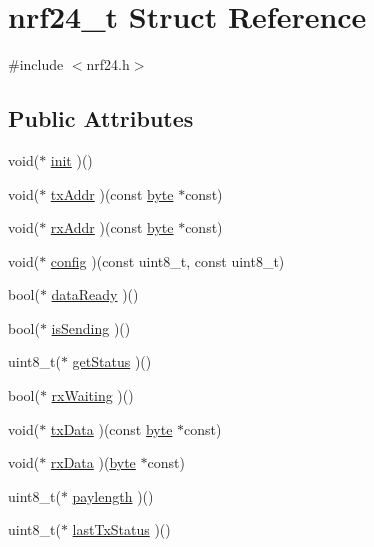 \hypertarget{structnrf24__t}{}\section{nrf24\+\_\+t Struct Reference}
\label{structnrf24__t}


{\ttfamily \#include $<$nrf24.\+h$>$}

\subsection*{Public Attributes}
\begin{DoxyCompactItemize}
\item 
void($\ast$ \hyperlink{structnrf24__t_a1b0228efa4dec38bb902bf988e905fd4}{init} )()
\item 
void($\ast$ \hyperlink{structnrf24__t_abfc805d8cb41f8a3bf611a76a5d830db}{tx\+Addr} )(const \hyperlink{cavrn_8h_ab8ef12fab634c171394422d0ee8baf94}{byte} $\ast$const)
\item 
void($\ast$ \hyperlink{structnrf24__t_acf773cd1e2f2c5c0ce507320f9b7a45f}{rx\+Addr} )(const \hyperlink{cavrn_8h_ab8ef12fab634c171394422d0ee8baf94}{byte} $\ast$const)
\item 
void($\ast$ \hyperlink{structnrf24__t_a84a2a68d2e139d5d1f12b26f1883f401}{config} )(const uint8\+\_\+t, const uint8\+\_\+t)
\item 
bool($\ast$ \hyperlink{structnrf24__t_ae3ba9b440dc852e8ef9ddc43304f3228}{data\+Ready} )()
\item 
bool($\ast$ \hyperlink{structnrf24__t_a187270f5a397a1425c860f06f1c946ba}{is\+Sending} )()
\item 
uint8\+\_\+t($\ast$ \hyperlink{structnrf24__t_ad0896af4e3e40a15bd991aec48769cd4}{get\+Status} )()
\item 
bool($\ast$ \hyperlink{structnrf24__t_a55d42334a0c98fdf58b7125c843d1370}{rx\+Waiting} )()
\item 
void($\ast$ \hyperlink{structnrf24__t_a1dbfdf83bc96820d8a24cb7a34f58ef8}{tx\+Data} )(const \hyperlink{cavrn_8h_ab8ef12fab634c171394422d0ee8baf94}{byte} $\ast$const)
\item 
void($\ast$ \hyperlink{structnrf24__t_a8d5ef96e697b56dcf24469366ebf2e58}{rx\+Data} )(\hyperlink{cavrn_8h_ab8ef12fab634c171394422d0ee8baf94}{byte} $\ast$const)
\item 
uint8\+\_\+t($\ast$ \hyperlink{structnrf24__t_ad8cd539e47d8d842d9877d1ae8d55097}{paylength} )()
\item 
uint8\+\_\+t($\ast$ \hyperlink{structnrf24__t_a2329173d4dd74a06cf2ee40f24a63732}{last\+Tx\+Status} )()

\end{DoxyCompactItemize}
